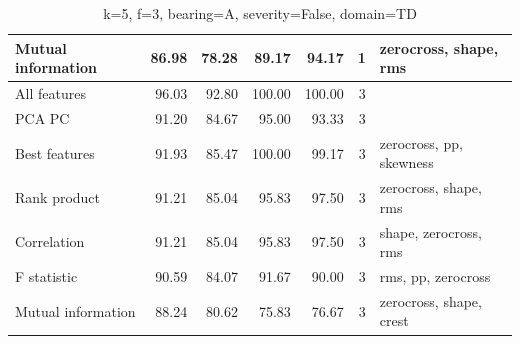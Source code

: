 \begin{table}[h]
\begin{adjustbox}{width=\textwidth}
\begin{tabular}{|l|rr|rr|r|l|}
Mutual information                    & \multicolumn{1}{r|}{86.98}          & 78.28                              & \multicolumn{1}{r|}{89.17}          & 94.17                              & 1                                                   & zerocross, shape, rms                   \\ \hline
All features                          & \multicolumn{1}{r|}{96.03}          & 92.80                              & \multicolumn{1}{r|}{100.00}         & 100.00                             & 3                                                   &                                         \\ \hline
PCA PC                                & \multicolumn{1}{r|}{91.20}          & 84.67                              & \multicolumn{1}{r|}{95.00}          & 93.33                              & 3                                                   &                                         \\ \hline
Best features                         & \multicolumn{1}{r|}{91.93}          & 85.47                              & \multicolumn{1}{r|}{100.00}         & 99.17                              & 3                                                   & zerocross, pp, skewness                 \\ \hline
Rank product                          & \multicolumn{1}{r|}{91.21}          & 85.04                              & \multicolumn{1}{r|}{95.83}          & 97.50                              & 3                                                   & zerocross, shape, rms                   \\ \hline
Correlation                           & \multicolumn{1}{r|}{91.21}          & 85.04                              & \multicolumn{1}{r|}{95.83}          & 97.50                              & 3                                                   & shape, zerocross, rms                   \\ \hline
F statistic                           & \multicolumn{1}{r|}{90.59}          & 84.07                              & \multicolumn{1}{r|}{91.67}          & 90.00                              & 3                                                   & rms, pp, zerocross                      \\ \hline
Mutual information                    & \multicolumn{1}{r|}{88.24}          & 80.62                              & \multicolumn{1}{r|}{75.83}          & 76.67                              & 3                                                   & zerocross, shape, crest                 \\ \hline
\end{tabular}
\end{adjustbox}
\caption{k=5, f=3, bearing=A, severity=False, domain=TD}
\end{table}





